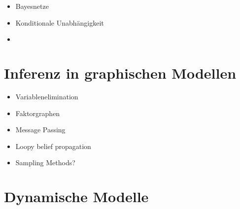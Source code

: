 \documentclass[ngerman]{../LaTeX-Templates/Paper/paper}
\begin{document}
\begin{itemize}
	\item Bayesnetze
	\item Konditionale Unabhängigkeit
	\item 
\end{itemize}

\section{Inferenz in graphischen Modellen}
\begin{itemize}
	\item Variablenelimination
	\item Faktorgraphen
	\item Message Passing
	\item Loopy belief propagation
	\item Sampling Methods?
\end{itemize}


\section{Dynamische Modelle}
\end{document}
